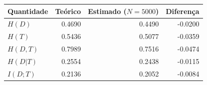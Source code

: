 \begin{tabular}{lrrr}
\toprule
Quantidade & Teórico & Estimado ($N=5000$) & Diferença \\
\midrule
$H(D)$ & 0.4690 & 0.4490 & -0.0200 \\
$H(T)$ & 0.5436 & 0.5077 & -0.0359 \\
$H(D,T)$ & 0.7989 & 0.7516 & -0.0474 \\
$H(D|T)$ & 0.2554 & 0.2438 & -0.0115 \\
$I(D;T)$ & 0.2136 & 0.2052 & -0.0084 \\
\bottomrule
\end{tabular}
